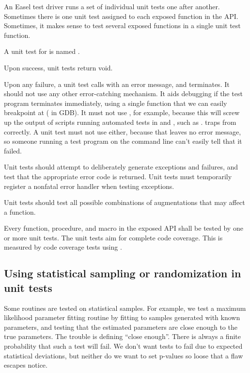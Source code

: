 An Easel test driver runs a set of individual unit tests one after
another.  Sometimes there is one unit test assigned to each exposed
function in the API. Sometimes, it makes sense to test several exposed
functions in a single unit test function.

A unit test for  is named . 

Upon success, unit tests return void.

Upon any failure, a unit test calls  with an error
message, and terminates. It should not use any other error-catching
mechanism. It aids debugging if the test program terminates
immediately, using a single function that we can easily breakpoint at
( in GDB). It must not use ,
for example, because this will screw up the output of scripts running
automated tests in  and , such as
.  traps  from
 correctly. A unit test must not use
 either, because that leaves no error message, so
someone running a test program on the command line can't easily tell
that it failed.

Unit tests should attempt to deliberately generate exceptions and
failures, and test that the appropriate error code is returned.  Unit
tests must temporarily register a nonfatal error handler when testing
exceptions. 

Unit tests should test all possible combinations of augmentations that
may affect a function.

Every function, procedure, and macro in the exposed API shall be
tested by one or more unit tests. The unit tests aim for complete code
coverage. This is measured by code coverage tests using .


\subsection{Using statistical sampling or randomization in unit tests}

Some routines are tested on statistical samples. For example, we test
a maximum likelihood parameter fitting routine by fitting to samples
generated with known parameters, and testing that the estimated
parameters are close enough to the true parameters.  The trouble is
defining ``close enough''. There is always a finite probability that
such a test will fail. We don't want tests to fail due to expected
statistical deviations, but neither do we want to set p-values so
loose that a flaw escapes notice.

